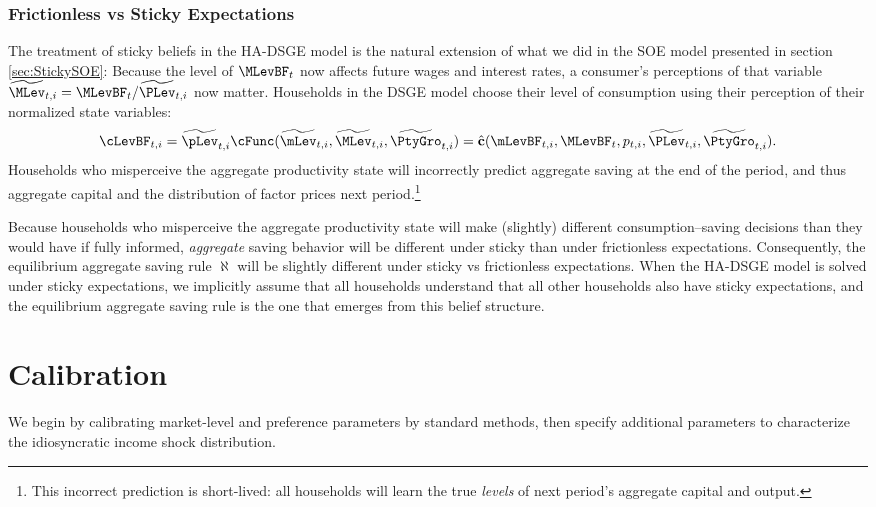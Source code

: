 \documentclass[titlepage]{\econtex}\newcommand{\texname}{cAndCwithStickyE}
\begin{document}
\subsubsection{Frictionless vs Sticky Expectations}

The treatment of sticky beliefs in the HA-DSGE model is the natural extension of what we did in the SOE model presented in section \ref{sec:StickySOE}: Because the level of $\MLevBF_t$ now affects future wages and interest rates, a consumer's perceptions of that variable $\perc{\MLev}_{t,i} = \MLevBF_t/\perc{\PLev}_{t,i}$ now matter.  Households in the DSGE model choose their level of consumption using their perception of their normalized state variables:
\begin{equation*}
\cLevBF_{t,i} = \perc{\pLev}_{t,i} \cFunc(\perc{\mLev}_{t,i},\perc{\MLev}_{t,i},\perc{\PtyGro}_{t,i}) = \hat{\textbf{c}}(\mLevBF_{t,i},\MLevBF_{t},p_{t,i},\perc{\PLev}_{t,i},\perc{\PtyGro}_{t,i}).
\end{equation*}
Households who misperceive the aggregate productivity state will incorrectly predict aggregate saving at the end of the period, and thus aggregate capital and the distribution of factor prices next period.\footnote{This incorrect prediction is short-lived: all households will learn the true \textit{levels} of next period's aggregate capital and output.}

Because households who misperceive the aggregate productivity state will make (slightly) different consumption--saving decisions than they would have if fully informed, \textit{aggregate} saving behavior will be different under sticky than under frictionless expectations.  Consequently, the equilibrium aggregate saving rule $\aleph$ will be slightly different under sticky vs frictionless expectations.  When the HA-DSGE model is solved under sticky expectations, we implicitly assume that all households understand that all other households also have sticky expectations, and the equilibrium aggregate saving rule is the one that emerges from this belief structure.



\section{Calibration}\label{sec:calibration}

We begin by calibrating market-level and preference parameters by standard methods, then specify additional parameters to characterize the idiosyncratic income shock distribution.
\end{document}
